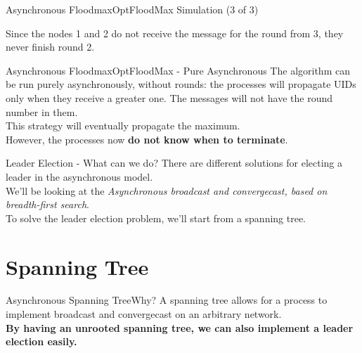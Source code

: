 \documentclass[pdf]{beamer}
\begin{document}
\begin{frame}{Asynchronous Floodmax}{OptFloodMax Simulation (3 of 3)}
\begin{center}
\end{center}
Since the nodes 1 and 2 do not receive the message for the round from 3, they never finish round 2. \\
\vspace{12pt}
\end{frame}

\begin{frame}{Asynchronous Floodmax}{OptFloodMax - Pure Asynchronous}
    The algorithm can be run purely asynchronously, without rounds: the processes will propagate UIDs only when they receive a greater one. The messages will not have the round number in them. \\
    \vspace{12pt}
    This strategy will eventually propagate the maximum.\\
    \vspace{12pt}
    However, the processes now \textbf{do not know when to terminate}.
\end{frame}

\begin{frame}{Leader Election - What can we do?}
    There are different solutions for electing a leader in the asynchronous model.\\
    \vspace{12pt}
    We'll be looking at the \emph{Asynchronous broadcast and convergecast, based on breadth-first search}.\\
    \vspace{12pt}
    To solve the leader election problem, we'll start from a spanning tree.
\end{frame}

\section{Spanning Tree}
\begin{frame}{Asynchronous Spanning Tree}{Why?}
    A spanning tree allows for a process to implement broadcast and convergecast on
    an arbitrary network.\\
    \vspace{12pt}
    \textbf{By having an unrooted spanning tree, we can also implement a leader election 
    easily.}
\end{frame}
\end{document}
